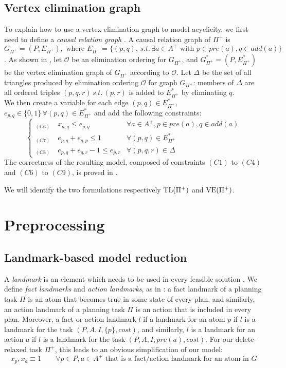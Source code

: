 \subsection{Vertex elimination graph}
To explain how to use a vertex elimination graph to model acyclicity, we first need to define a \textit{causal relation graph} \cite{Rankooh_22_2}.
A causal relation graph of $\Pi^+$ is $G_{\Pi^+}=(P,E_{\Pi^+}),\mbox{ where }E_{\Pi^+}=\{(p,q),\,s.t.\,\exists a\in A^+\mbox{ with }p\in pre(a),q\in add(a)\}$.
As shown in \cite{Rankooh_22}, let $\mathcal{O}$ be an elimination ordering for $G_{\Pi^+}$, and $G^*_{\Pi^+}=(P,E^*_{\Pi^+})$ be the vertex elimination graph of $G_{\Pi^+}$ according to $\mathcal{O}$. Let $\Delta$ be the set of all triangles produced by elimination ordering $\mathcal{O}$ for graph $G_{\Pi^+}$: members of $\Delta$ are all ordered triples $(p,q,r)\,s.t.\,(p,r)$ is added to $E^*_{\Pi^+}$ by eliminating $q$.\\
We then create a variable for each edge $(p,q)\in E^*_{\Pi^+}$, $e_{p,q}\in\{0,1\}\,\forall (p,q)\in E^*_{\Pi^+}$ and add the following constraints:
$$
\begin{cases}
    _{(C6)}\quad x_{a,q}\leq e_{p,q}&\forall a\in A^+,p\in pre(a),q\in add(a)\\
    _{(C7)}\quad e_{p,q}+e_{q,p}\leq 1&\forall(p,q)\in E^*_{\Pi^+}\\
    _{(C8)}\quad e_{p,q}+e_{q,r}-1\leq e_{p,r}&\forall(p,q,r)\in\Delta
\end{cases}
$$
The correctness of the resulting model, composed of constraints $(C1)$ to $(C4)$ and $(C6)$ to $(C9)$, is proved in \cite{Rankooh_22}.

We will identify the two formulations respectively $\mbox{TL}(\Pi^+)$ and $\mbox{VE}(\Pi^+)$.

\section{Preprocessing}
\subsection{Landmark-based model reduction}
A \textit{landmark} is an element which needs to be used in every feasible solution \cite{Hoffman_04}. We define \textit{fact landmarks} and \textit{action landmarks}, as in \cite{Gefen_12}: a fact landmark of a planning task $\Pi$ is an atom that becomes true in some state of every plan, and similarly, an action landmark of a planning task $\Pi$ is an action that is included in every plan. Moreover, a fact or action landmark $l$ if a landmark for an atom $p$ if $l$ is a landmark for the task $(P,A,I,\{p\},cost)$, and similarly, $l$ is a landmark for an action $a$ if $l$ is a landmark for the task $(P,A,I,pre(a),cost)$.
For our delete-relaxed task $\Pi^+$, this leads to an obvious simplification of our model:
$$x_p,x_a\equiv1\qquad\forall p\in P,a\in A^+\mbox{ that is a fact/action landmark for an atom in }G$$

